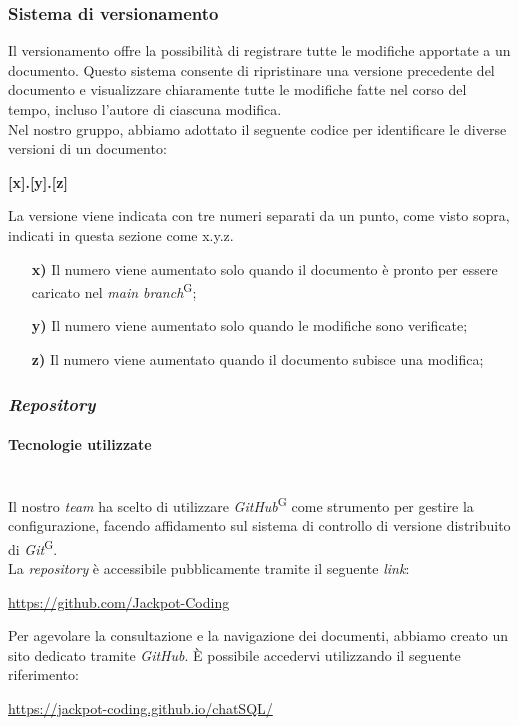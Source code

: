 \documentclass[5pt]{article}
\begin{document}
    \subsubsection{Sistema di versionamento}
    Il versionamento offre la possibilità di registrare tutte le modifiche apportate a un documento. Questo sistema consente di ripristinare una versione precedente del documento e visualizzare chiaramente tutte le modifiche fatte nel corso del tempo, incluso l'autore di ciascuna modifica.\\
    Nel nostro gruppo, abbiamo adottato il seguente codice per identificare le diverse versioni di un documento:
    \begin{center}
    \textbf{[x].[y].[z]}
    \end{center}
    La versione viene indicata con tre numeri separati da un punto, come visto sopra, indicati in questa sezione come x.y.z.
    \begin{itemize}
    \item[\textbf{x)}] Il numero viene aumentato solo quando il documento è pronto per essere caricato nel \textit{main branch}\textsuperscript{G};
    \item[\textbf{y)}] Il numero viene aumentato solo quando le modifiche sono verificate;
    \item[\textbf{z)}] Il numero viene aumentato quando il documento subisce una modifica;
    \end{itemize}  
    
    \subsubsection{\textit{Repository}}
    \paragraph{Tecnologie utilizzate}~\\
    Il nostro \textit{team} ha scelto di utilizzare \textit{GitHub}\textsuperscript{G} come strumento per gestire la configurazione, facendo affidamento sul sistema di controllo di versione distribuito di \textit{Git}\textsuperscript{G}.\\
    La \textit{repository} è accessibile pubblicamente tramite il seguente \textit{link}:
    \begin{center}
    \url{https://github.com/Jackpot-Coding}\\
    \end{center}
    Per agevolare la consultazione e la navigazione dei documenti, abbiamo creato un sito dedicato tramite \textit{GitHub}. È possibile accedervi utilizzando il seguente riferimento:
    \begin{center}
    \url{https://jackpot-coding.github.io/chatSQL/}\\
    \end{center}
\end{document}
